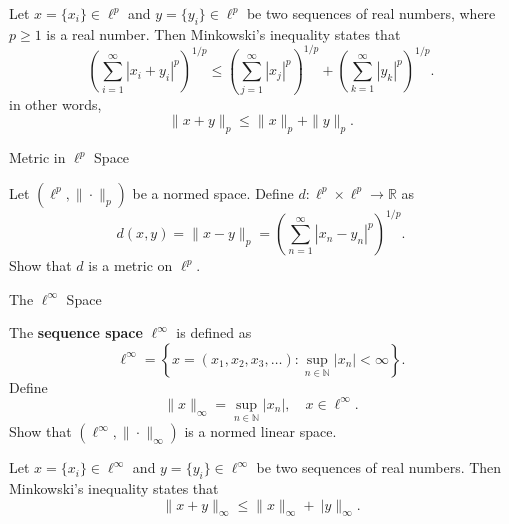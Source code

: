 \documentclass[12pt, a4paper]{article}
\begin{document}
\begin{theorem}
Let $x=\{x_i\}\in \ell^p$ and $y=\{y_i\}\in \ell^p$ be two sequences of real numbers,
where $p\ge 1$ is a real number. Then Minkowski's inequality states that
\[
\left(\sum_{i=1}^{\infty} |x_i + y_i|^p \right)^{\!1/p}
\le
\left(\sum_{j=1}^{\infty} |x_j|^p \right)^{\!1/p}
+
\left(\sum_{k=1}^{\infty} |y_k|^p \right)^{\!1/p}.
\]
in other words, \[\|x+y\|_p\le \|x\|_p+\|y\|_p.\]
\end{theorem}

\clearpage

\begin{heading}
    Metric in $\ell^p$ Space
\end{heading}

\vspace{10pt}

\begin{theorem}
    Let $(\ell^p,\|\cdot\|_p)$ be a normed space. Define $d:\ell^p\times \ell^p\to\mathbb{R}$ as
    \[
        d(x,y)=\|x-y\|_p=\left(\sum_{n=1}^\infty|x_n-y_n|^p\right)^{\!1/p}.
    \]
    Show that $d$ is a metric on $\ell^p$.
\end{theorem}

\clearpage

\begin{heading}
    The $\ell^\infty$ Space
\end{heading}

\vspace{10pt}

\begin{definition}
    The \textbf{sequence space} $\ell^\infty$ is defined as
    \[
        \ell^\infty=\left\{x=(x_1, x_2, x_3, \dots):\sup_{n\in\mathbb{N}}|x_n|<\infty\right\}.
    \]
    Define \[\|x\|_\infty=\sup_{n\in\mathbb{N}}|x_n|, \quad x\in\ell^\infty.\]
    Show that $(\ell^\infty,\|\cdot\|_\infty)$ is a normed linear space.
\end{definition}

\clearpage

\begin{theorem}
Let $x=\{x_i\}\in \ell^\infty$ and $y=\{y_i\}\in \ell^\infty$ be two sequences of real numbers. Then Minkowski's inequality states that
\[\|x+y\|_\infty\le \|x\|_\infty+\
|y\|_\infty.\]
\end{theorem}

\clearpage
\end{document}
